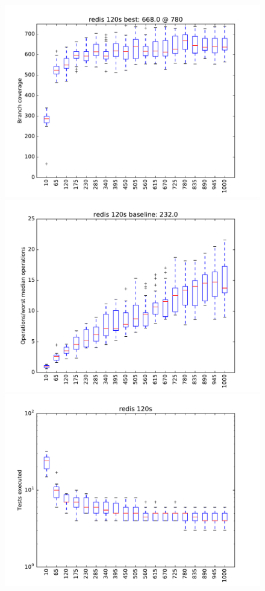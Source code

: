 \begin{figure}
\includegraphics[width=\columnwidth]{graphs/redisrand120}
\includegraphics[width=\columnwidth]{graphs/opsredisrand120}
\includegraphics[width=\columnwidth]{graphs/execredisrand120}
\end{figure}


